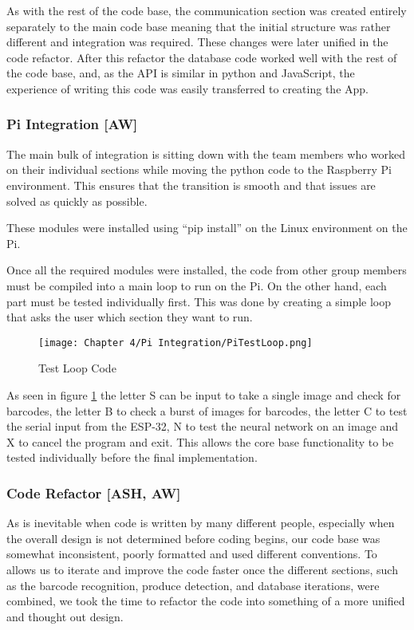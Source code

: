As with the rest of the code base, the communication section was created entirely separately to the main code base meaning that the initial structure was rather different and integration was required.
These changes were later unified in the code refactor.
After this refactor the database code worked well with the rest of the code base, and, as the API is similar in python and JavaScript, the experience of writing this code was easily transferred to creating the App.

\subsubsection {Pi Integration [AW]}

The main bulk of integration is sitting down with the team members who worked on their individual sections while moving the python code to the Raspberry Pi environment.
This ensures that the transition is smooth and that issues are solved as quickly as possible.


These modules were installed using “pip install” on the Linux environment on the Pi.

Once all the required modules were installed, the code from other group members must be compiled into a main loop to run on the Pi.
On the other hand, each part must be tested individually first.
This was done by creating a simple loop that asks the user which section they want to run.

\begin{figure}[H]        
    \centering
    \texttt{[image: Chapter 4/Pi Integration/PiTestLoop.png]}
    \caption{Test Loop Code}
    \label{fig:tlcode}
\end{figure} 

As seen in figure \ref{fig:tlcode} the letter S can be input to take a single image and check for barcodes, the letter B to check a burst of images for barcodes, the letter C to test the serial input from the ESP-32, N to test the neural network on an image and X to cancel the program and exit.
This allows the core base functionality to be tested individually before the final implementation.

\subsubsection {Code Refactor [ASH, AW]}

As is inevitable when code is written by many different people, especially when the overall design is not determined before coding begins, our code base was somewhat inconsistent, poorly formatted and used different conventions.
To allows us to iterate and improve the code faster once the different sections, such as the barcode recognition, produce detection, and database iterations, were combined, we took the time to refactor the code into something of a more unified and thought out design.

